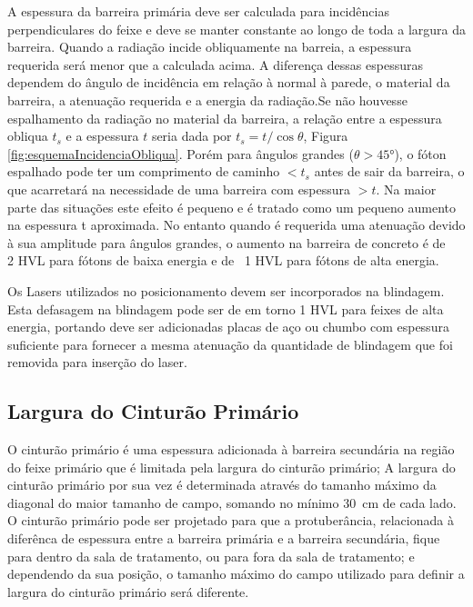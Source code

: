 \documentclass[11pt,a4paper]{article}
\begin{document}
            A espessura da barreira primária deve ser calculada para incidências perpendiculares do feixe e deve se manter constante ao longo de toda a largura da barreira. Quando a radiação incide obliquamente na barreia, a espessura requerida será menor que a calculada acima. A diferença dessas espessuras dependem do ângulo de incidência em relação à normal à parede, o material da barreira, a atenuação requerida e a energia da radiação.Se não houvesse espalhamento da radiação no material da barreira, a relação entre a espessura obliqua $t_s$ e a espessura $t$ seria dada por $t_s = t/ \cos \theta$, Figura \ref{fig:esquemaIncidenciaObliqua}. Porém para ângulos grandes ($\theta > \ang{45}$), o fóton espalhado  pode ter um comprimento de caminho $< t_s$ antes de sair da barreira, o que acarretará na necessidade de uma barreira com espessura $> t$. Na maior parte das situações este efeito é pequeno e é tratado como um pequeno aumento na espessura t aproximada. No entanto quando é requerida uma atenuação devido à sua amplitude para ângulos grandes, o aumento na barreira de concreto é de ~ 2 HVL para fótons de baixa energia e de ~1 HVL para fótons de alta energia.

            Os Lasers utilizados no posicionamento devem ser incorporados na blindagem. Esta defasagem na blindagem pode ser de em torno 1 HVL para feixes de alta energia, portando deve ser adicionadas placas de aço ou chumbo com espessura suficiente para fornecer a mesma atenuação da quantidade de blindagem que foi removida para inserção do laser.


        \subsection{Largura do Cinturão Primário}

            O cinturão primário é uma espessura adicionada à barreira secundária na região do feixe primário que é limitada pela largura do cinturão primário; A largura do cinturão primário por sua vez é determinada através do tamanho máximo da diagonal do maior tamanho de campo, somando no mínimo \qty{30}{cm} de cada lado. O cinturão primário pode ser projetado para que a protuberância, relacionada à diferênca de espessura entre a barreira primária e a  barreira secundária, fique para dentro da sala de tratamento, ou para fora da sala de tratamento; e dependendo da sua posição, o tamanho máximo do campo utilizado para definir a largura do cinturão primário será diferente. 
\end{document}
